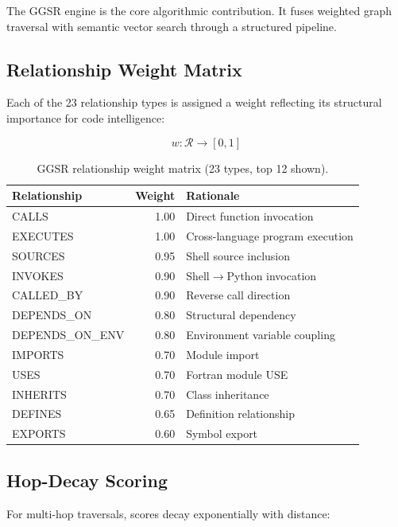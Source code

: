 \documentclass[11pt,letterpaper]{article}
\begin{document}
The GGSR engine is the core algorithmic contribution. It fuses weighted
graph traversal with semantic vector search through a structured pipeline.

\subsection{Relationship Weight Matrix}

Each of the 23 relationship types is assigned a weight reflecting its
structural importance for code intelligence:

\begin{equation}
\label{eq:weights}
w: \mathcal{R} \rightarrow [0, 1]
\end{equation}

\begin{table}[H]
\centering
\caption{GGSR relationship weight matrix (23 types, top 12 shown).}
\label{tab:weights}
\small
\begin{tabular}{@{}lrl@{}}
\toprule
\textbf{Relationship} & \textbf{Weight} & \textbf{Rationale} \\
\midrule
CALLS      & 1.00 & Direct function invocation \\
EXECUTES   & 1.00 & Cross-language program execution \\
SOURCES    & 0.95 & Shell source inclusion \\
INVOKES    & 0.90 & Shell$\to$Python invocation \\
CALLED\_BY & 0.90 & Reverse call direction \\
DEPENDS\_ON & 0.80 & Structural dependency \\
DEPENDS\_ON\_ENV & 0.80 & Environment variable coupling \\
IMPORTS    & 0.70 & Module import \\
USES       & 0.70 & Fortran module USE \\
INHERITS   & 0.70 & Class inheritance \\
DEFINES    & 0.65 & Definition relationship \\
EXPORTS    & 0.60 & Symbol export \\
\bottomrule
\end{tabular}
\end{table}

\subsection{Hop-Decay Scoring}

For multi-hop traversals, scores decay exponentially with distance:
\end{document}
